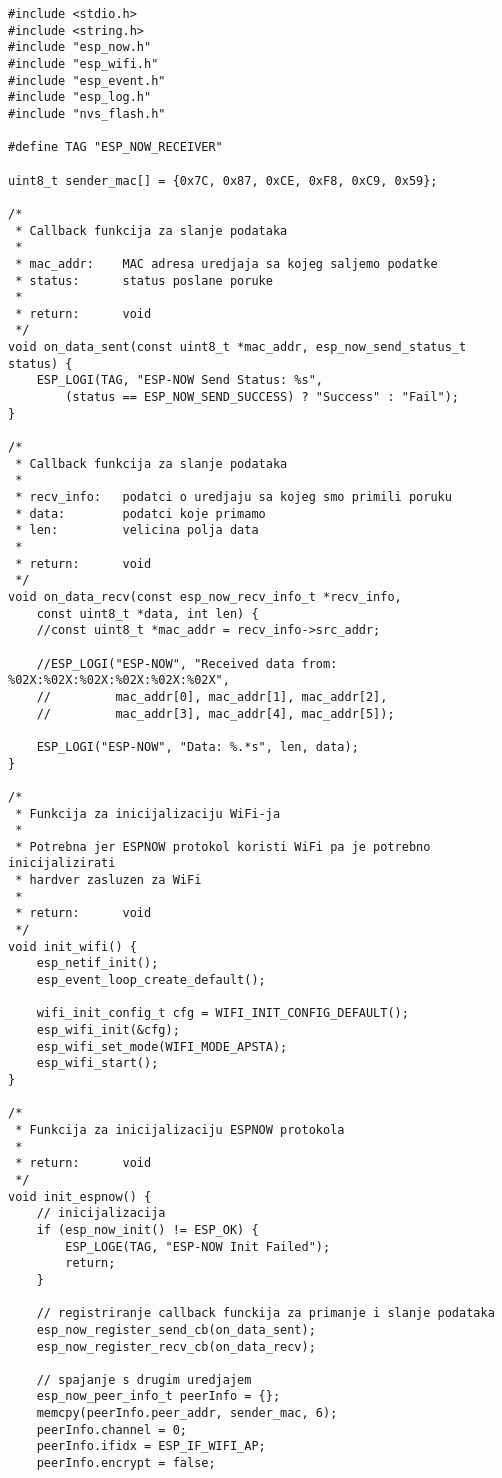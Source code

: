 \documentclass[seminarskirad]{fer}
\begin{document}
\begin{lstlisting}[caption=ESP-NOW receiver]
#include <stdio.h>
#include <string.h>
#include "esp_now.h"
#include "esp_wifi.h"
#include "esp_event.h"
#include "esp_log.h"
#include "nvs_flash.h"

#define TAG "ESP_NOW_RECEIVER"

uint8_t sender_mac[] = {0x7C, 0x87, 0xCE, 0xF8, 0xC9, 0x59};

/*
 * Callback funkcija za slanje podataka
 * 
 * mac_addr:    MAC adresa uredjaja sa kojeg saljemo podatke
 * status:      status poslane poruke
 * 
 * return:      void
 */
void on_data_sent(const uint8_t *mac_addr, esp_now_send_status_t status) {
    ESP_LOGI(TAG, "ESP-NOW Send Status: %s", 
        (status == ESP_NOW_SEND_SUCCESS) ? "Success" : "Fail");
}

/*
 * Callback funkcija za slanje podataka
 * 
 * recv_info:   podatci o uredjaju sa kojeg smo primili poruku
 * data:        podatci koje primamo
 * len:         velicina polja data
 * 
 * return:      void
 */
void on_data_recv(const esp_now_recv_info_t *recv_info, 
    const uint8_t *data, int len) {
    //const uint8_t *mac_addr = recv_info->src_addr;

    //ESP_LOGI("ESP-NOW", "Received data from: %02X:%02X:%02X:%02X:%02X:%02X",
    //         mac_addr[0], mac_addr[1], mac_addr[2], 
    //         mac_addr[3], mac_addr[4], mac_addr[5]);

    ESP_LOGI("ESP-NOW", "Data: %.*s", len, data);
}

/*
 * Funkcija za inicijalizaciju WiFi-ja
 * 
 * Potrebna jer ESPNOW protokol koristi WiFi pa je potrebno inicijalizirati 
 * hardver zasluzen za WiFi
 * 
 * return:      void
 */
void init_wifi() {
    esp_netif_init();
    esp_event_loop_create_default();

    wifi_init_config_t cfg = WIFI_INIT_CONFIG_DEFAULT();
    esp_wifi_init(&cfg);
    esp_wifi_set_mode(WIFI_MODE_APSTA);
    esp_wifi_start();
}

/*
 * Funkcija za inicijalizaciju ESPNOW protokola
 * 
 * return:      void
 */
void init_espnow() {
    // inicijalizacija
    if (esp_now_init() != ESP_OK) {
        ESP_LOGE(TAG, "ESP-NOW Init Failed");
        return;
    }

    // registriranje callback funckija za primanje i slanje podataka
    esp_now_register_send_cb(on_data_sent);
    esp_now_register_recv_cb(on_data_recv);

    // spajanje s drugim uredjajem
    esp_now_peer_info_t peerInfo = {};
    memcpy(peerInfo.peer_addr, sender_mac, 6);
    peerInfo.channel = 0;
    peerInfo.ifidx = ESP_IF_WIFI_AP; 
    peerInfo.encrypt = false;


\end{lstlisting}
\end{document}

